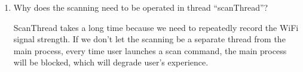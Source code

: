 \begin{enumerate}
  \item Why does the scanning need to be operated in thread ``scanThread''?
  
  ScanThread takes a long time because we need to repeatedly record the WiFi signal strength. If we don't let the scanning be a separate thread from the main process, every time user launches a scan command, the main process will be blocked, which will degrade user's experience.
  

\end{enumerate}